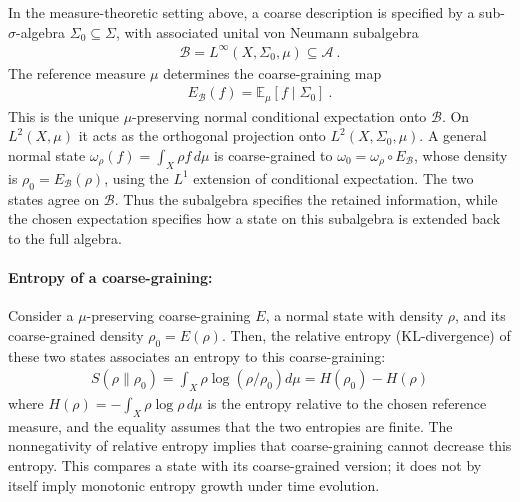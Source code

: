 \documentclass[a4paper,11pt]{article}
\theoremstyle{definition}
\newcommand{\mA}{\mathcal{A}}
\newcommand{\mB}{\mathcal{B}}
\begin{document}
In the measure-theoretic setting above, a coarse description is specified by a sub-$\sigma$-algebra $\Sigma_0\subseteq\Sigma$, with associated unital von Neumann subalgebra
\begin{align}
    \mB=L^\infty(X,\Sigma_0,\mu)\subseteq\mA\ .
\end{align}
The reference measure $\mu$ determines the coarse-graining map
\begin{align}
    E_{\mB}(f)=\mathbb E_\mu[f\mid\Sigma_0]\ .
\end{align}
This is the unique $\mu$-preserving normal conditional expectation onto $\mB$. On $L^2(X,\mu)$ it acts as the orthogonal projection onto $L^2(X,\Sigma_0,\mu)$. A general normal state $\omega_\rho(f)=\int_X\rho f\,d\mu$ is coarse-grained to $\omega_0=\omega_\rho\circ E_{\mB}$, whose density is $\rho_0=E_{\mB}(\rho)$, using the $L^1$ extension of conditional expectation. The two states agree on $\mB$. Thus the subalgebra specifies the retained information, while the chosen expectation specifies how a state on this subalgebra is extended back to the full algebra.


\paragraph{Entropy of a coarse-graining:} Consider a $\mu$-preserving coarse-graining $E$, a normal state with density $\rho$, and its coarse-grained density $\rho_0=E(\rho)$. Then, the relative entropy (KL-divergence) of these two states associates an entropy to this coarse-graining:
\begin{align}
    S(\rho\|\rho_0)=\int_X \rho \log(\rho/\rho_0)d\mu=H(\rho_0)-H(\rho)
\end{align}
where $H(\rho)=-\int_X\rho\log\rho\,d\mu$ is the entropy relative to the chosen reference measure, and the equality assumes that the two entropies are finite. The nonnegativity of relative entropy implies that coarse-graining cannot decrease this entropy. This compares a state with its coarse-grained version; it does not by itself imply monotonic entropy growth under time evolution.
\end{document}
